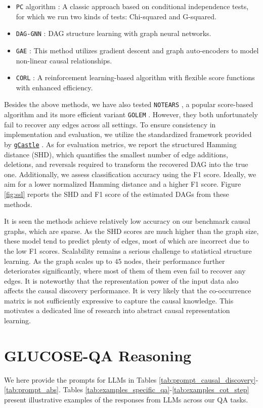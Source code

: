 \begin{itemize}
    \item \texttt{PC} algorithm \citep{spirtes1991algorithm}: A classic approach based on conditional independence tests, for which we run two kinds of tests: Chi-squared and G-squared. 
    \item \texttt{DAG-GNN} \citep{yu2019dag}: DAG structure learning with graph neural networks.
    \item \texttt{GAE} \citep{ng2019graph}: This method utilizes gradient descent and graph auto-encoders to model non-linear causal relationships.
    \item \texttt{CORL} \citep{wang2021ordering}: A reinforcement learning-based algorithm with flexible score functions with enhanced efficiency.
\end{itemize}

Besides the above methods, we have also tested \texttt{NOTEARS} \citep{zheng2020learning}, a popular score-based algorithm and its more efficient variant \texttt{GOLEM} \citep{ng2020role}. However, they both unfortunately fail to recover any edges across all settings. To ensure consistency in implementation and evaluation, we utilize the standardized framework provided by \href{https://github.com/huawei-noah/trustworthyAI/tree/master/gcastle}{\texttt{gCastle}} \citep{zhang2021gcastle}. 
As for evaluation metrics, we report the structured Hamming distance (SHD), which quantifies the smallest number of edge additions, deletions, and reversals required to transform the recovered DAG into the true one. Additionally, we assess classification accuracy using the F1 score. Ideally, we aim for a lower normalized Hamming distance and a higher F1 score. Figure \ref{fig:ssl} reports the SHD and F1 score of the estimated DAGs from these methods. 

It is seen the methods achieve relatively low accuracy on our benchmark causal graphs, which are sparse. As the SHD scores are much higher than the graph size, these model tend to predict plenty of edges, most of which are incorrect due to the low F1 scores. Scalability remains a serious challenge to statistical structure learning. As the graph scales up to $45$ nodes, their performance further deteriorates significantly, where most of them of them even fail to recover any edges. It is noteworthy that the representation power of the input data also affects the causal discovery performance. It is very likely that the co-occurrence matrix is not sufficiently expressive to capture the causal knowledge. This motivates a dedicated line of research into abstract causal representation learning. 


\section{GLUCOSE-QA Reasoning}  \label{sup:reasoning}
We here provide the prompts for LLMs in Tables \ref{tab:prompt_causal_discovery}-\ref{tab:prompt_abs}. Tables \ref{tab:examples_specific_qa}-\ref{tab:examples_cot_step} present illustrative examples of the responses from LLMs across our QA tasks. 






